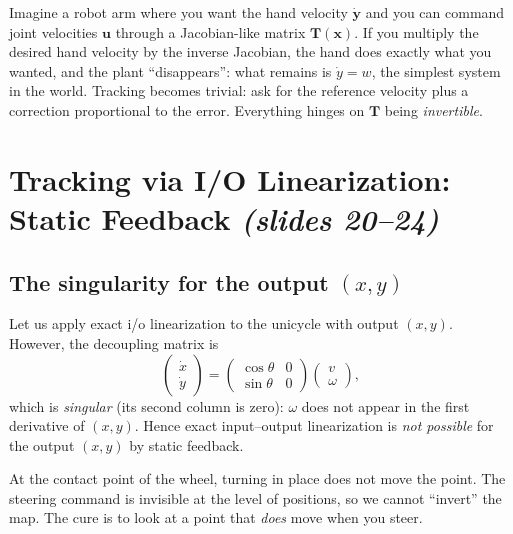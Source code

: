 \documentclass[11pt,a4paper]{article}
\newcommand{\vect}[1]{\bm{#1}}
\theoremstyle{plain}
\theoremstyle{definition}
\theoremstyle{remark}
\begin{document}
\begin{intuition}
Imagine a robot arm where you want the hand velocity $\dot{\vect y}$ and you can command joint velocities $\vect u$ through a Jacobian-like matrix $\vect T(\vect x)$. If you multiply the desired hand velocity by the inverse Jacobian, the hand does exactly what you wanted, and the plant ``disappears'': what remains is $\dot y=w$, the simplest system in the world. Tracking becomes trivial: ask for the reference velocity plus a correction proportional to the error. Everything hinges on $\vect T$ being \emph{invertible}.
\end{intuition}

\section{Tracking via I/O Linearization: Static Feedback \texorpdfstring{\emph{(slides 20--24)}}{(slides 20--24)}}

\subsection{The singularity for the output $(x,y)$}

Let us apply exact i/o linearization to the unicycle with output $(x,y)$. However, the decoupling matrix is
\[
\begin{pmatrix}\dot x\\\dot y\end{pmatrix}=\begin{pmatrix}\cos\theta&0\\\sin\theta&0\end{pmatrix}\begin{pmatrix}v\\\omega\end{pmatrix},
\]
which is \emph{singular} (its second column is zero): $\omega$ does not appear in the first derivative of $(x,y)$. Hence exact input--output linearization is \emph{not possible} for the output $(x,y)$ by static feedback.

\begin{intuition}
At the contact point of the wheel, turning in place does not move the point. The steering command is invisible at the level of positions, so we cannot ``invert'' the map. The cure is to look at a point that \emph{does} move when you steer.
\end{intuition}
\end{document}
